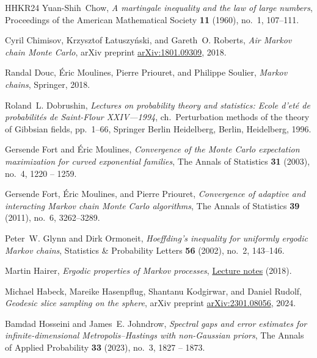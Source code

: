 \documentclass[12pt]{article}
\theoremstyle{definition}
\begin{document}
\begin{thebibliography}{HHKR24}
	Yuan-Shih~Chow, \emph{A martingale inequality and the law of large numbers},
	Proceedings of the American Mathematical Society \textbf{11} (1960), no.~1,
	107--111.
	
	Cyril Chimisov, Krzysztof {\L}atuszy{\'n}ski, and Gareth~O. Roberts, \emph{Air
		{M}arkov chain {M}onte {C}arlo}, arXiv preprint
	\href{https://arxiv.org/abs/1801.09309}{arXiv:1801.09309}, 2018.
	
	Randal Douc, {\'E}ric Moulines, Pierre Priouret, and Philippe Soulier,
	\emph{Markov chains}, Springer, 2018.
	
	Roland~L. Dobrushin, \emph{Lectures on probability theory and statistics: Ecole
		d'et{\'e} de probabilit{\'e}s de {S}aint-{F}lour {XXIV}---1994},
	ch.~Perturbation methods of the theory of Gibbsian fields, pp.~1--66,
	Springer Berlin Heidelberg, Berlin, Heidelberg, 1996.
	
	Gersende Fort and {\'E}ric Moulines, \emph{{Convergence of the Monte Carlo
			expectation maximization for curved exponential families}}, The Annals of
	Statistics \textbf{31} (2003), no.~4, 1220 -- 1259.
	
	Gersende Fort, {\'E}ric Moulines, and Pierre Priouret, \emph{Convergence of
		adaptive and interacting {M}arkov chain {M}onte Carlo algorithms}, The
	Annals of Statistics \textbf{39} (2011), no.~6, 3262--3289.
	
	Peter~W. Glynn and Dirk Ormoneit, \emph{Hoeffding's inequality for uniformly
		ergodic {M}arkov chains}, Statistics \& Probability Letters \textbf{56}
	(2002), no.~2, 143--146.
	
	Martin Hairer, \emph{Ergodic properties of Markov processes},
	\href{https://www.hairer.org/notes/Markov.pdf}{Lecture notes} (2018).
	
	Michael Habeck, Mareike Hasenpflug, Shantanu Kodgirwar, and Daniel Rudolf,
	\emph{Geodesic slice sampling on the sphere}, arXiv preprint
	\href{https://arxiv.org/abs/2301.08056}{arXiv:2301.08056}, 2024.
	
	Bamdad Hosseini and James~E. Johndrow, \emph{{Spectral gaps and error estimates
			for infinite-dimensional {M}etropolis–{H}astings with non-{G}aussian
			priors}}, The Annals of Applied Probability \textbf{33} (2023), no.~3, 1827
	-- 1873.
	

\end{thebibliography}
\end{document}
